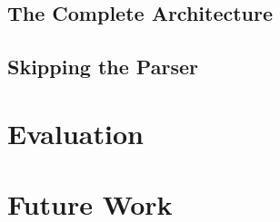 \documentclass[
	msc,
	english
]{ppgccufmg}
\begin{document}
	  \section{The Complete Architecture}
	  \section{Skipping the Parser}
	\chapter{Evaluation}
	\chapter{Future Work}





\end{document}
